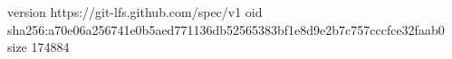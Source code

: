 version https://git-lfs.github.com/spec/v1
oid sha256:a70e06a256741e0b5aed771136db52565383bf1e8d9e2b7c757cccfce32faab0
size 174884
